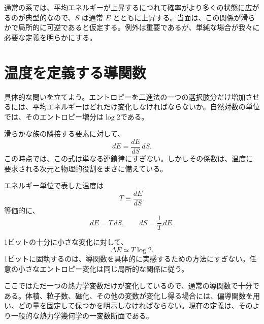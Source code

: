 通常の系では、平均エネルギーが上昇するにつれて確率がより多くの状態に広がるのが典型的なので、\(S\) は通常 \(\overline E\) とともに上昇する。当面は、この関係が滑らかで局所的に可逆であると仮定する。例外は重要であるが、単純な場合が我々に必要な定義を明らかにする。

\section{温度を定義する導関数}

具体的な問いを立てよう。エントロピーを二進法の一つの選択肢分だけ増加させるには、平均エネルギーはどれだけ変化しなければならないか。自然対数の単位では、そのエントロピー増分は\(\log2\)である。

滑らかな族の隣接する要素に対して、
\begin{equation}
 dE=\frac{dE}{dS}\,dS.
 \label{eq:sm2-differential-identity}
\end{equation}
この時点では、この式は単なる連鎖律にすぎない。しかしその係数は、温度に要求される次元と物理的役割をまさに備えている。

\begin{definition}
エネルギー単位で表した温度は
\begin{equation}
 T\equiv\frac{dE}{dS}.
 \label{eq:sm2-temperature-definition}
\end{equation}
等価的に、
\begin{equation}
 dE=T\,dS,
 \qquad
 dS=\frac{1}{T}\,dE.
 \label{eq:sm2-fundamental-differentials}
\end{equation}
\end{definition}

1ビットの十分に小さな変化に対して、
\begin{equation}
 \Delta E\simeq T\log2.
 \label{eq:sm2-one-bit-energy}
\end{equation}
1ビットに固執するのは、導関数を具体的に実感するための方法にすぎない。任意の小さなエントロピー変化は同じ局所的な関係に従う。

\begin{classroomqa}
\end{classroomqa}

ここではただ一つの熱力学変数だけが変化しているので、通常の導関数で十分である。体積、粒子数、磁化、その他の変数が変化し得る場合には、偏導関数を用い、どの量を固定して保つかを明示しなければならない。現在の定義は、そのより一般的な熱力学幾何学の一変数断面である。

